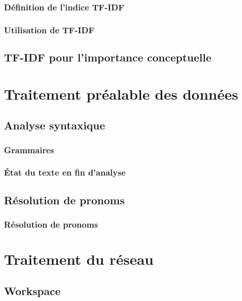 \documentclass[12pt, handout]{beamer}
\begin{document}
\begin{frame}
 \frametitle{Définition de l'indice TF-IDF}
 
 
\end{frame}

\begin{frame}
 \frametitle{Utilisation de TF-IDF}
 
 
\end{frame}

\subsection{TF-IDF pour l'importance conceptuelle}

\begin{frame}
 \frametitle{}
 
 
\end{frame}


\section{Traitement préalable des données}

\subsection{Analyse syntaxique}

\begin{frame}
 \frametitle{Grammaires}
 
 
\end{frame}

\begin{frame}
 \frametitle{État du texte en fin d'analyse}
 
 
\end{frame}

\subsection{Résolution de pronoms}

\begin{frame}[allowframebreaks = 0.7]
 \frametitle{Résolution de pronoms}
 
 
\end{frame}

\section{Traitement du réseau}

\subsection{Workspace}
\end{document}
